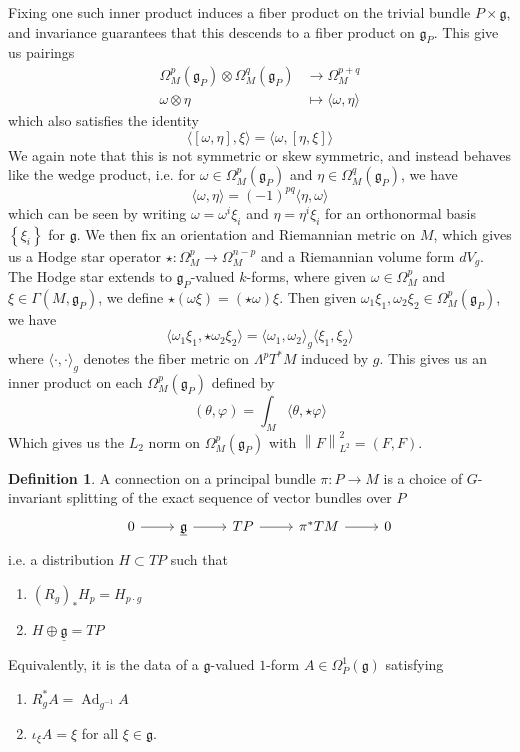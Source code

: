 \documentclass[psamsfonts, 12pt]{amsart}
\theoremstyle{definition}
\newtheorem{defn}[thm]{Definition}
\theoremstyle{remark}
\newcommand{\g}{\mathfrak{g}}
\newcommand{\inv}{^{-1}}
\newcommand{\set}[1]{\left\lbrace #1 \right\rbrace}
\newcommand{\norm}[1]{\left\lVert#1\right\rVert}
\DeclareMathOperator{\Ad}{Ad}
\begin{document}
Fixing one such inner product induces a fiber product on the trivial bundle $P \times \g$,
and invariance guarantees that this descends to a fiber product on $\g_P$. This give us
pairings
\begin{align*}
\Omega^p_M(\g_P) \otimes \Omega^q_M(\g_P) &\to \Omega^{p+q}_M \\
\omega \otimes \eta &\mapsto \langle \omega, \eta \rangle
\end{align*}
%
which also satisfies the identity
\[
\langle[\omega,\eta],\xi\rangle = \langle \omega,[\eta,\xi]\rangle
\]
We again note that this is not symmetric or skew symmetric, and instead behaves
like the wedge product, i.e. for $\omega \in \Omega^p_M(\g_P)$ and
$\eta \in \Omega^q_M(\g_P)$, we have
\[
\langle \omega,\eta \rangle = (-1)^{pq}\langle \eta,\omega\rangle
\]
which can be seen by writing $\omega = \omega^i\xi_i$ and $\eta = \eta^i\xi_i$
for an orthonormal basis $\set{\xi_i}$ for $\g$.
%
We then fix an orientation and Riemannian metric on $M$, which gives us a Hodge
star operator $\star : \Omega^p_M \to \Omega^{n-p}_M$ and a Riemannian volume form
$dV_g$. The Hodge star extends to $\g_P$-valued $k$-forms, where given
$\omega \in \Omega^p_M$ and $\xi \in \Gamma(M,\g_P)$, we define
$\star(\omega\xi) = (\star\omega)\xi$. Then given
$\omega_1\xi_1,\omega_2\xi_2 \in \Omega^p_M(\g_P)$, we have
\[
\langle\omega_1\xi_1,\star\omega_2\xi_2\rangle =
\langle \omega_1,\omega_2\rangle_g\langle\xi_1,\xi_2\rangle
\]
where $\langle\cdot,\cdot\rangle_g$ denotes the fiber metric on $\Lambda^pT^*M$
induced by $g$. This gives us an inner product on each $\Omega^p_M(\g_P)$ defined
by
\[
(\theta,\varphi) = \int_M \langle \theta,\star\varphi\rangle
\]
Which gives us the $L_2$ norm on $\Omega^p_M(\g_P)$ with $\norm{F}_{L^2}^2 = (F,F)$.
\begin{defn}
A connection on a principal bundle $\pi : P \to M$ is a choice of $G$-invariant splitting
of the exact sequence of vector bundles over $P$
\[\begin{tikzcd}
0 \ar[r] & \underline{\g} \ar[r] & TP \ar[r] & \pi^*TM \ar[r] & 0
\end{tikzcd}\]
i.e. a distribution $H \subset TP$ such that
\begin{enumerate}
  \item $(R_g)_*H_p = H_{p\cdot g}$
  \item $H \oplus \underline{\g} = TP$
\end{enumerate}
Equivalently, it is the data of a $\g$-valued $1$-form $A \in \Omega^1_P(\g)$
satisfying
\begin{enumerate}
  \item $R_g^*A = \Ad_{g\inv} A$
  \item $\iota_\xi A = \xi$ for all $\xi \in \g$.
\end{enumerate}
\end{defn}
\end{document}
